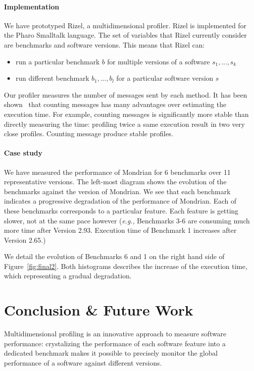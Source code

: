 \documentclass[10pt, conference, compsocconf]{IEEEtran}
\newcommand{\eg}{\emph{e.g.,}\xspace}
\newcommand{\figref}[1]{Figure~\ref{fig:#1}}
\begin{document}
\paragraph{Implementation}
We have prototyped Rizel, a multidimensional profiler. Rizel is implemented for the Pharo Smalltalk language. The set of variables that Rizel currently consider are benchmarks and software versions. This means that Rizel can:
\begin{itemize}
\item run a particular benchmark $b$ for multiple versions of a software $s_1, ... , s_k$
\item run different benchmark $b_1, ..., b_l$ for a particular software version $s$
\end{itemize}

Our profiler measures the number of messages sent by each method. It has been shown~\cite{Berg11d} that counting messages has many advantages over estimating the execution time. For example, counting messages is significantly more stable than directly measuring the time: profiling twice a same execution result in two very close profiles. Counting message produce stable profiles.

\paragraph{Case study}
We have measured the performance of Mondrian for 6 benchmarks over 11 representative versions. 
The left-most diagram shows the evolution of the benchmarks against the version of Mondrian. We see that each benchmark indicates a progressive degradation of the performance of Mondrian. Each of these benchmarks corresponds to a particular feature. Each feature is getting slower, not at the same pace however (\eg Benchmarks 3-6 are consuming much more time after Version 2.93. Execution time of Benchmark 1 increases after Version 2.65.)

We detail the evolution of Benchmarks 6 and 1 on the right hand side of \figref{final2}. Both histograms describes the increase of the execution time, which representing a gradual degradation.


\section{Conclusion \& Future Work}

Multidimensional profiling is an innovative approach to measure software performance: crystalizing the performance of each software feature into a dedicated benchmark makes it possible to precisely monitor the global performance of a software against different versions.
\end{document}
